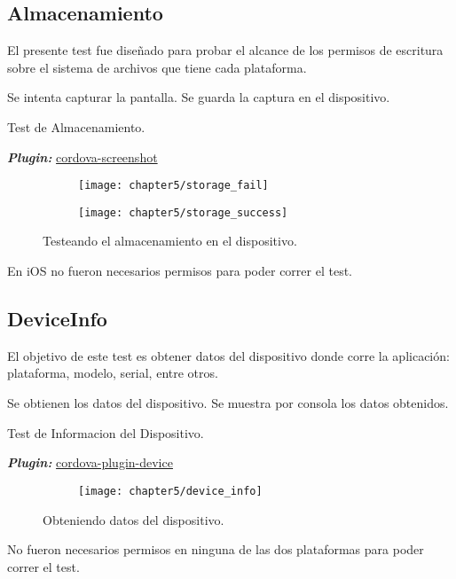\subsection{Almacenamiento}
El presente test fue diseñado para probar el alcance de los permisos de escritura sobre el sistema de archivos que tiene cada plataforma.\\
\begin{algorithm}
	\begin{algorithmic}[1]
		\STATE Se intenta capturar la pantalla.
		\STATE Se guarda la captura en el dispositivo.
		
	\end{algorithmic}
	\caption{Test de Almacenamiento.}\label{alg:chap5_test_storage}
\end{algorithm}
\textbf{\emph{Plugin:}} \href{https://github.com/gitawego/cordova-screenshot}{cordova-screenshot}\\
\begin{figure}[hbtp]
   \centering
   	\begin{subfigure}{.3\linewidth}
		\texttt{[image: chapter5/storage\_fail]}
		\label{fig:ch05:storage_fail}
	\end{subfigure}
	\begin{subfigure}{.3\linewidth}
		\texttt{[image: chapter5/storage\_success]}
		\label{fig:ch05:storage_success}
	\end{subfigure}
	\caption{Testeando el almacenamiento en el dispositivo.}
	\label{fig:ch05:storage_test}
\end{figure}
En iOS no fueron necesarios permisos para poder correr el test.
\newpage
\subsection{DeviceInfo}
El objetivo de este test es obtener datos del dispositivo donde corre la aplicación: plataforma, modelo, serial, entre otros.\\
\begin{algorithm}
	\begin{algorithmic}[1]
		\STATE Se obtienen los datos del dispositivo.
		\STATE Se muestra por consola los datos obtenidos.
	\end{algorithmic}
	\caption{Test de Informacion del Dispositivo.}\label{alg:chap5_test_info}
\end{algorithm}
\textbf{\emph{Plugin:}} \href{https://www.npmjs.com/package/cordova-plugin-device}{cordova-plugin-device}\\
\begin{figure}[hbtp]
   \centering
   	\begin{subfigure}{.3\linewidth}
		\texttt{[image: chapter5/device\_info]}
		\label{fig:ch05:device-info-success}
	\end{subfigure}
	\caption{Obteniendo datos del dispositivo.}
	\label{fig:ch05:device-info}
\end{figure}
No fueron necesarios permisos en ninguna de las dos plataformas para poder correr el test.
\newpage
